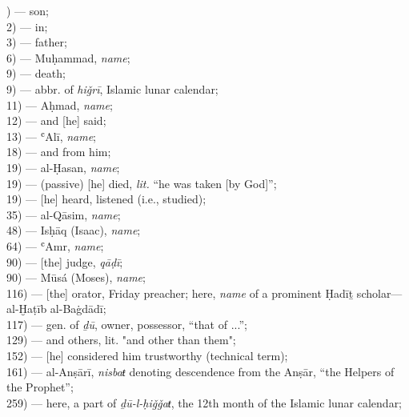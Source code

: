 \begin{multicols}{3}

) \mbox{} ---  son;\\
2) \mbox{} ---  in;\\
3) \mbox{} ---  father;\\
6) \mbox{} ---  Muḥammad, \textit{name};\\
9) \mbox{} ---  death;\\
9) \mbox{} ---  abbr. of \textit{hiǧrī}, Islamic lunar calendar;\\
11) \mbox{} ---  Aḥmad, \textit{name};\\
12) \mbox{} ---  and [he] said;\\
13) \mbox{} ---  ʿAlī, \textit{name};\\
18) \mbox{} ---  and from him;\\
19) \mbox{} ---  al-Ḥasan, \textit{name};\\
19) \mbox{} ---  (passive) [he] died, \textit{lit.} ``he was taken [by God]'';\\
19) \mbox{} ---  [he] heard, listened (i.e., studied);\\
35) \mbox{} ---  al-Qāsim, \textit{name};\\
48) \mbox{} ---  Isḥāq (Isaac), \textit{name};\\
64) \mbox{} ---  ʿAmr, \textit{name};\\
90) \mbox{} ---  [the] judge, \textit{qāḍī};\\
90) \mbox{} ---  Mūsá (Moses), \textit{name};\\
116) \mbox{} ---  [the] orator, Friday preacher; here, \textit{name} of a prominent Ḥadīṯ scholar---al-Ḫaṭīb al-Baġdādī;\\
117) \mbox{} ---  gen. of \textit{ḏū}, owner, possessor, ``that of ...'';\\
129) \mbox{} ---  and others, lit. "and other than them";\\
152) \mbox{} ---  [he] considered him trustworthy (technical term);\\
161) \mbox{} ---  al-Anṣārī, \textit{nisbaŧ} denoting descendence from the Anṣār, ``the Helpers of the Prophet'';\\
259) \mbox{} ---  here, a part of \textit{ḏū-l-ḥiǧǧaŧ}, the 12th month of the Islamic lunar calendar;\\

\end{multicols}
